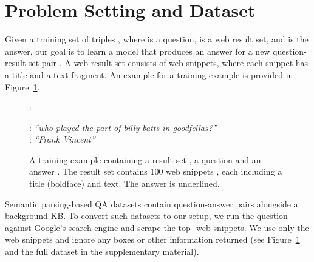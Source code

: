 \documentclass[11pt,a4paper]{article}
\newcommand\nl[1]{{\it``#1''}}
\begin{document}
 \section{Problem Setting and Dataset}
\label{sec:data}
Given a training set of triples , where  is a question,  is a web result set, and  is the answer, our goal is to learn a model that produces an answer  for a new question-result set pair . A web result set  consists of  web snippets, where each snippet  has a title and a text fragment. An example for a training example is provided in Figure~\ref{fig:training_ex}.

\begin{figure}
\centering
\noindent
\small 

:
\begin{minipage}{23em}
\noindent \textbf{}: \nl{who played the part of billy batts in goodfellas?}\\
\noindent \textbf{}: \nl{Frank Vincent}
\end{minipage}
\caption{\small A training example containing a result set , a question  and an answer .
The result set  contains 100 web snippets , each including a title (boldface) and text. The answer is underlined.
}
\label{fig:training_ex}
\end{figure}
 
Semantic parsing-based QA datasets contain question-answer pairs alongside a background KB. To convert such datasets to our setup, we run the question  against Google's search engine and scrape the top- web snippets. We use only the web snippets and ignore any boxes or other information returned (see Figure~\ref{fig:training_ex} and the full dataset in the supplementary material).
\end{document}
